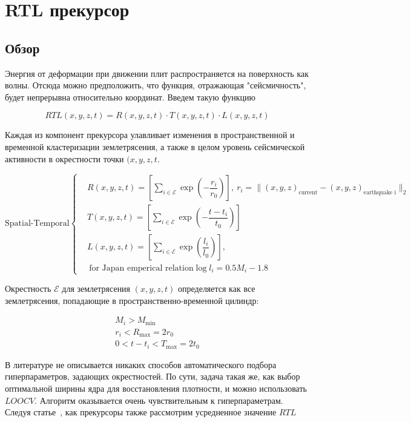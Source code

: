 \section{RTL прекурсор}
\subsection{Обзор}
Энергия от деформации при движении плит распространяется на поверхность как волны. Отсюда можно предположить, что функция, отражающая "сейсмичность", будет непрерывна относительно координат. Введем такую функцию

$$
RTL(x,y,z,t)  = R(x,y,z,t)\cdot T(x,y,z,t)\cdot L(x,y,z,t)
$$

Каждая из компонент прекурсора улавливает изменения в пространственной и временной кластеризации землетрясения, а также в целом уровень сейсмической активности в окрестности точки $(x, y, z, t$.

\begin{equation*}
\text{Spatial-Temporal}\left\{\begin{aligned}
& R(x,y,z,t) = \left[\sum\limits_{i\in\mathcal{E}}\exp\left(-\dfrac{r_i}{r_0}\right)\right],~  r_i = \|(x,y,z)_{\text{current}} - (x,y,z)_{\text{earthquake i}} \|_2 \\
& T(x,y,z,t) = \left[\sum\limits_{i\in\mathcal{E}}\exp\left(-\dfrac{t-t_i}{t_0}\right)\right] \\
& L(x,y,z,t) = \left[\sum\limits_{i\in\mathcal{E}}\exp\left(\dfrac{l_i}{l_0}\right)\right] ,\\
&~\text{for Japan emperical relation} \log l_i = 0.5M_i - 1.8
\end{aligned}\right.
\end{equation*}


Окрестность $\mathcal{E}$ для землетрясения $(x,y,z,t)$ определяется как все землетрясения, попадающие в пространственно-временной цилиндр:

\begin{equation*}
\begin{aligned}
M_i > M_{\min} \\
r_i < R_{\max} = 2r_0 \\
0< t - t_i < T_{\max} = 2t_0
\end{aligned}
\end{equation*}

В литературе не описывается никаких способов автоматического подбора гиперпараметров, задающих окрестностей. По сути, задача такая же, как выбор оптимальной ширины ядра для восстановления плотности, и можно использовать $LOOCV$. Алгоритм оказывается очень чувствительным к гиперпараметрам.
\newpage
Следуя статье~\cite{rtl}, как прекурсоры также рассмотрим усредненное значение $RTL$


